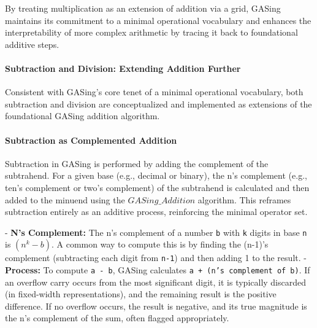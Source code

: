 By treating multiplication as an extension of addition via a grid, GASing maintains its commitment to a minimal operational vocabulary and enhances the interpretability of more complex arithmetic by tracing it back to foundational additive steps.
\paragraph{Subtraction and Division: Extending Addition Further}

Consistent with GASing's core tenet of a minimal operational vocabulary, both subtraction and division are conceptualized and implemented as extensions of the foundational GASing addition algorithm.
\paragraph{Subtraction as Complemented Addition}

Subtraction in GASing is performed by adding the complement of the subtrahend. For a given base (e.g., decimal or binary), the n's complement (e.g., ten's complement or two's complement) of the subtrahend is calculated and then added to the minuend using the \texttt{$GASing\_{Addition}$} algorithm. This reframes subtraction entirely as an additive process, reinforcing the minimal operator set.

- \textbf{N's Complement:} The n's complement of a number \texttt{b} with \texttt{k} digits in base \texttt{n} is \texttt{$(n^{k} - b)$}. A common way to compute this is by finding the (n-1)'s complement (subtracting each digit from \texttt{n-1}) and then adding 1 to the result.
- \textbf{Process:} To compute \texttt{a - b}, GASing calculates \texttt{a + (n's complement of b)}. If an overflow carry occurs from the most significant digit, it is typically discarded (in fixed-width representations), and the remaining result is the positive difference. If no overflow occurs, the result is negative, and its true magnitude is the n's complement of the sum, often flagged appropriately.

